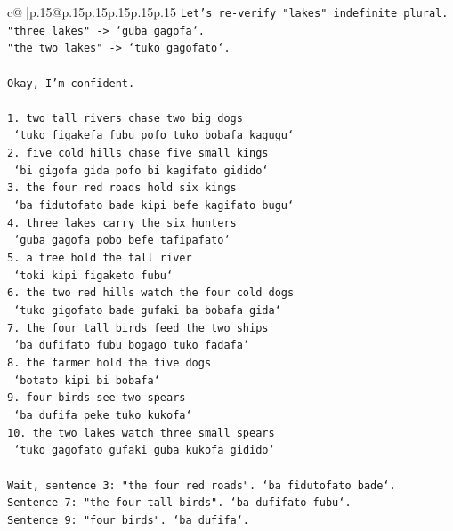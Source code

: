 \documentclass{article}
\begin{document}
{\begin{supertabular}{c@{$\;$}|p{.15\linewidth}@{}p{.15\linewidth}p{.15\linewidth}p{.15\linewidth}p{.15\linewidth}p{.15\linewidth}}
{{{\texttt{Let's re{-}verify "lakes" indefinite plural.} \\
\texttt{"three lakes" {-}> `guba gagofa`.} \\
\texttt{"the two lakes" {-}> `tuko gagofato`.} \\
\\ 
\texttt{Okay, I'm confident.} \\
\\ 
\texttt{1. two tall rivers chase two big dogs} \\
\texttt{   `tuko figakefa fubu pofo tuko bobafa kagugu`} \\
\texttt{2. five cold hills chase five small kings} \\
\texttt{   `bi gigofa gida pofo bi kagifato gidido`} \\
\texttt{3. the four red roads hold six kings} \\
\texttt{   `ba fidutofato bade kipi befe kagifato bugu`} \\
\texttt{4. three lakes carry the six hunters} \\
\texttt{   `guba gagofa pobo befe tafipafato`} \\
\texttt{5. a tree hold the tall river} \\
\texttt{   `toki kipi figaketo fubu`} \\
\texttt{6. the two red hills watch the four cold dogs} \\
\texttt{   `tuko gigofato bade gufaki ba bobafa gida`} \\
\texttt{7. the four tall birds feed the two ships} \\
\texttt{   `ba dufifato fubu bogago tuko fadafa`} \\
\texttt{8. the farmer hold the five dogs} \\
\texttt{   `botato kipi bi bobafa`} \\
\texttt{9. four birds see two spears} \\
\texttt{   `ba dufifa peke tuko kukofa`} \\
\texttt{10. the two lakes watch three small spears} \\
\texttt{    `tuko gagofato gufaki guba kukofa gidido`} \\
\\ 
\texttt{Wait, sentence 3: "the four red roads". `ba fidutofato bade`.} \\
\texttt{Sentence 7: "the four tall birds". `ba dufifato fubu`.} \\
\texttt{Sentence 9: "four birds". `ba dufifa`.} \\
}}}
\end{supertabular}}
\end{document}
